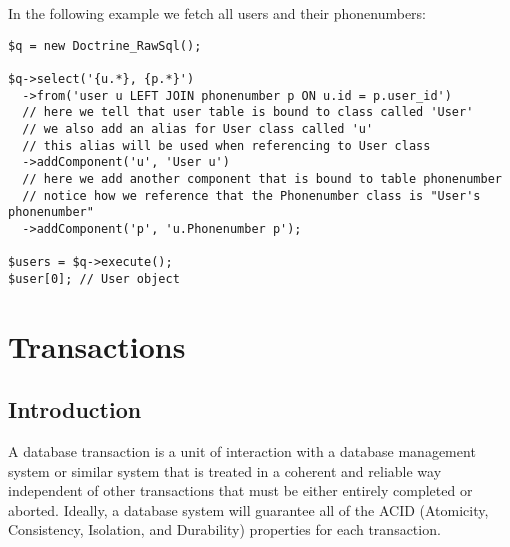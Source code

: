 \documentclass[11pt,a4paper]{report}
\begin{document}
In the following example we fetch all users and their phonenumbers:

\begin{verbatim}
$q = new Doctrine_RawSql();

$q->select('{u.*}, {p.*}')
  ->from('user u LEFT JOIN phonenumber p ON u.id = p.user_id')
  // here we tell that user table is bound to class called 'User'
  // we also add an alias for User class called 'u'
  // this alias will be used when referencing to User class
  ->addComponent('u', 'User u')
  // here we add another component that is bound to table phonenumber
  // notice how we reference that the Phonenumber class is "User's phonenumber"
  ->addComponent('p', 'u.Phonenumber p');

$users = $q->execute();
$user[0]; // User object
\end{verbatim}

\chapter{Transactions}
\section{Introduction}
A database transaction is a unit of interaction with a database management system or similar system that is treated in a coherent and reliable way independent of other transactions that must be either entirely completed or aborted. Ideally, a database system will guarantee all of the ACID (Atomicity, Consistency, Isolation, and Durability) properties for each transaction.
\end{document}
